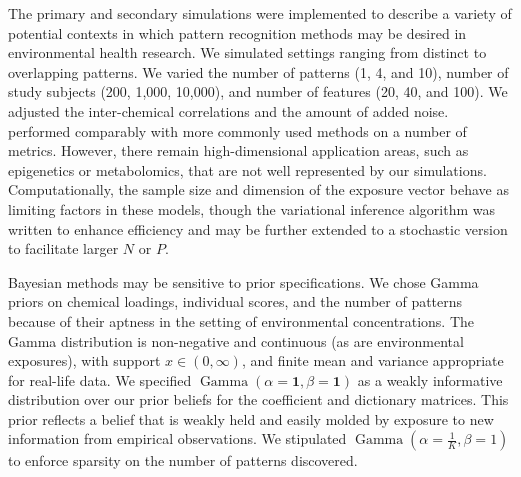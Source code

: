 The primary and secondary simulations were implemented to describe a variety of potential contexts in which pattern recognition methods may be desired in environmental health research. We simulated settings ranging from distinct to overlapping patterns. We varied the number of patterns (1, 4, and 10), number of study subjects (200, 1,000, 10,000), and number of features (20, 40, and 100). We adjusted the inter-chemical correlations and the amount of added noise. \bnmf performed comparably with more commonly used methods on a number of metrics. However, there remain high-dimensional application areas, such as epigenetics or metabolomics, that are not well represented by our simulations. Computationally, the sample size and dimension of the exposure vector behave as limiting factors in these models, though the variational inference algorithm was written to enhance efficiency and may be further extended to a stochastic version to facilitate larger $N$ or $P$.

Bayesian methods may be sensitive to prior specifications. We chose Gamma priors on chemical loadings, individual scores, and the number of patterns because of their aptness in the setting of environmental concentrations. The Gamma distribution is non-negative and continuous (as are environmental exposures), with support $x \in(0, \infty)$, and finite mean and variance appropriate for real-life data. We specified $\operatorname{Gamma}(\alpha = \mathbf{1}, \beta = \mathbf{1})$ as a weakly informative distribution over our prior beliefs for the coefficient and dictionary matrices. This prior reflects a belief that is weakly held and easily molded by exposure to new information from empirical observations. We stipulated $\operatorname{Gamma}(\alpha = \frac{1}{K}, \beta = 1)$ to enforce sparsity on the number of patterns discovered.

